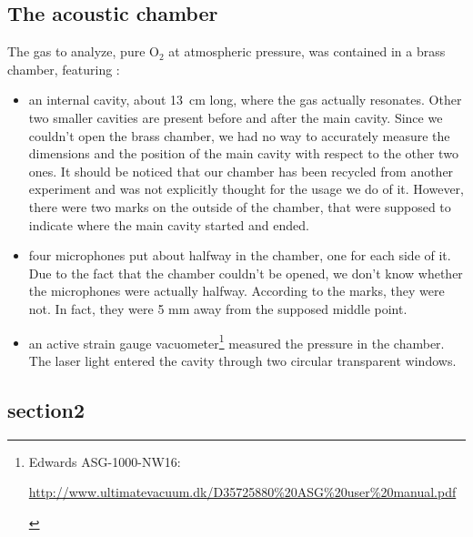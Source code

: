 \documentclass[a4paper,11pt]{article}
\begin{document}
\subsection{The acoustic chamber} 
 The gas to analyze, pure O$_2$ at atmospheric pressure, was contained in a brass chamber, featuring :
\begin{itemize}
\item an internal cavity, about \mbox{13 cm} long, where the gas actually resonates. Other two smaller cavities are present before and after the main cavity. Since we couldn't open the brass chamber, we had no way to accurately measure the dimensions and the position of the main cavity with respect to the other two ones. It should be noticed that our chamber has been recycled from another experiment and was not explicitly thought for the usage we do of it. However, there were two marks on the outside of the chamber, that were supposed to indicate where the main cavity started and ended.
\item four microphones put about halfway in the chamber, one for each side of it. Due to the fact that the chamber couldn't be opened, we don't know whether the microphones were actually halfway. According to the marks, they were not. In fact, they were 5 mm away from the supposed middle point.
\item an active strain gauge vacuometer\footnote{Edwards ASG-1000-NW16:\vspace{-10pt}
\begin{flushright} \url{http://www.ultimatevacuum.dk/D35725880\%20ASG\%20user\%20manual.pdf}
\end{flushright}} measured the pressure in the chamber.
The laser light entered the cavity through two circular transparent windows.
\end{itemize}
\subsection{section2}
\end{document}

